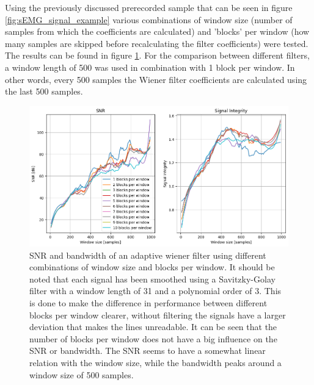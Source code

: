 Using the previously discussed prerecorded sample that can be seen in figure \ref{fig:sEMG_signal_example} various combinations of window size (number of samples from which the coefficients are calculated) and 'blocks' per window (how many samples are skipped before recalculating the filter coefficients) were tested. The results can be found in figure \ref{fig:adaptive_wiener_windowsize}. For the comparison between different filters, a window length of 500 was used in combination with 1 block per window. In other words, every 500 samples the Wiener filter coefficients are calculated using the last 500 samples.

\begin{figure}[h!t]
	\begin{center}
		\includegraphics[width=1.0\columnwidth]{images/adaptive_wiener_windowsize.png}
	\end{center}
	\caption{SNR and bandwidth of an adaptive wiener filter using different combinations of window size and blocks per window. It should be noted that each signal has been smoothed using a Savitzky-Golay filter with a window length of 31 and a polynomial order of 3. This is done to make the difference in performance between different blocks per window clearer, without filtering the signals have a larger deviation that makes the lines unreadable.
	It can be seen that the number of blocks per window does not have a big influence on the SNR or bandwidth. The SNR seems to have a somewhat linear relation with the window size, while the bandwidth peaks around a window size of 500 samples.}
	\label{fig:adaptive_wiener_windowsize}
\end{figure}


